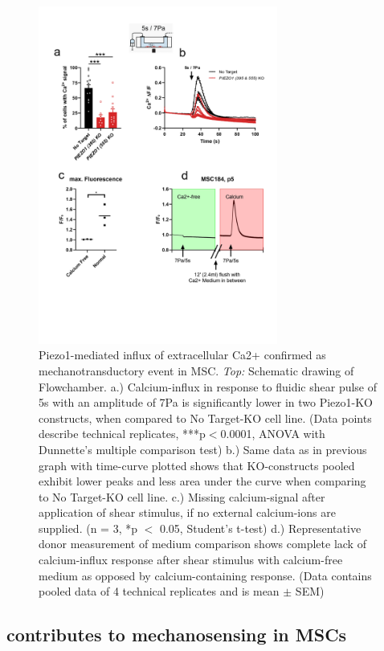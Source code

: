 \begin{figure}
    \centering
    \includegraphics[width = 0.7\textwidth]{Combined_CalciumFree_KnockOut.png}
    \caption{Piezo1-mediated influx of extracellular Ca2+ confirmed as mechanotransductory event in MSC. \textit{Top:} Schematic drawing of Flowchamber. a.) Calcium-influx in response to fluidic shear pulse of 5s with an amplitude of 7Pa is significantly lower in two Piezo1-KO constructs, when compared to No Target-KO cell line. (Data points describe technical replicates, ***p$<$0.0001, ANOVA with Dunnette's multiple comparison test) b.) Same data as in previous graph with time-curve plotted shows that KO-constructs pooled exhibit lower peaks and less area under the curve when comparing to No Target-KO cell line. c.) Missing calcium-signal after application of shear stimulus, if no external calcium-ions are supplied. (n = 3, *p $<$ 0.05, Student's t-test) d.) Representative donor measurement of medium comparison shows complete lack of calcium-influx response after shear stimulus with calcium-free medium as opposed by calcium-containing response. (Data contains pooled data of 4 technical replicates and is mean $\pm$ SEM)}
    \label{fig:Calcium}
\end{figure}


\subsection{\Piezo{} contributes to mechanosensing in MSCs}

